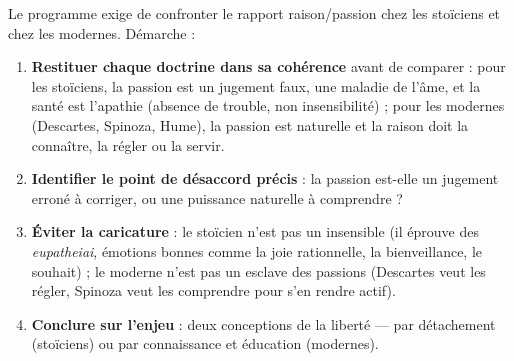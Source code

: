 \documentclass[11pt]{article}
\begin{document}
\begin{methode}
Le programme exige de confronter le rapport raison/passion chez les stoïciens et chez les modernes. Démarche :
\begin{enumerate}
\item \textbf{Restituer chaque doctrine dans sa cohérence} avant de comparer : pour les stoïciens, la passion est un jugement faux, une maladie de l'âme, et la santé est l'apathie (absence de trouble, non insensibilité) ; pour les modernes (Descartes, Spinoza, Hume), la passion est naturelle et la raison doit la connaître, la régler ou la servir.
\item \textbf{Identifier le point de désaccord précis} : la passion est-elle un jugement erroné à corriger, ou une puissance naturelle à comprendre ?
\item \textbf{Éviter la caricature} : le stoïcien n'est pas un insensible (il éprouve des \emph{eupatheiai}, émotions bonnes comme la joie rationnelle, la bienveillance, le souhait) ; le moderne n'est pas un esclave des passions (Descartes veut les régler, Spinoza veut les comprendre pour s'en rendre actif).
\item \textbf{Conclure sur l'enjeu} : deux conceptions de la liberté — par détachement (stoïciens) ou par connaissance et éducation (modernes).
\end{enumerate}
\end{methode}
\end{document}
